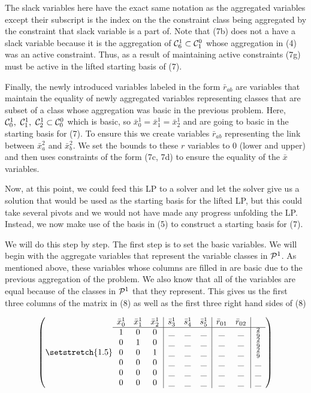 \documentclass[11pt]{article} %
\newcommand{\cP}{{\cal P}}
\newcommand{\cC}{{\cal C}}
\begin{document}
	The slack variables here have the exact same notation as the aggregated variables except their subscript is the index on the the constraint class being aggregated by the constraint that slack variable is a part of.  Note that (7b) does not a have a slack variable because it is the aggregation of $\cC^1_6 \subset \cC^0_1$ whose aggregation in (4) was an active constraint.  Thus, as a result of maintaining active constraints (7g) must be active in the lifted starting basis of (7).
	
	Finally, the newly introduced variables labeled in the form $\bar{r}_{ab}$ are variables that maintain the equality of newly aggregated variables representing classes that are subset of a class whose aggregation was basic in the previous problem.  Here, $\cC^1_0, \ \cC^1_1, \ \cC^1_2 \subset \cC^0_0$ which is basic, so $\bar{x}_0^1 = \bar{x}_1^1 = \bar{x}_2^1$ and are going to basic in the starting basis for (7).  To ensure this we create variables $\bar{r}_{ab}$ representing the link between $\bar{x}_a^2$ and $\bar{x}_b^2$.  We set the bounds to these $r$ variables to 0 (lower and upper) and then uses constraints of the form (7c, 7d) to ensure the equality of the $\bar{x}$ variables.
	
	Now, at this point, we could feed this LP to a solver and let the solver give us a solution that would be used as the starting basis for the lifted LP, but this could take several pivots and we would not have made any progress unfolding the LP.  Instead, we now make use of the basis in (5) to construct a starting basis for (7). 
	
	We will do this step by step.  The first step is to set the basic variables.  We will begin with the aggregate variables that represent the variable classes in $\cP^1$.  As mentioned above, these variables whose columns are filled in are basic due to the previous aggregation of the problem.  We also know that all of the variables are equal because of the classes in $\cP^1$ that they represent.  This gives us the first three columns of the matrix in (8) as well as the first three right hand sides of (8)
	
	\begin{equation}
	\begin{pmatrix}\setstretch{1.5}
	\begin{array}{ccc|ccc|cc|c}
	\bar{x}^1_0 & \bar{x}^1_1 & \bar{x}^1_2 & \bar{s}^1_3 & \bar{s}^1_4 & \bar{s}^1_5 & \bar{r}_{01} & \bar{r}_{02} \\
	\hline
	1 & 0 & 0 & \_ & \_ &\_ & \_ & \_ & \frac{2}{9} \\ 
	0 & 1 & 0 & \_ & \_ &\_ & \_ & \_ & \frac{2}{9} \\ 
	0 & 0 & 1 & \_ & \_ &\_ & \_ & \_ & \frac{2}{9} \\ 
	0 & 0 & 0 &\_ & \_ &\_ & \_ & \_& \_ \\ 
	0 & 0 & 0 & \_ & \_ &\_ & \_ & \_& \_ \\
	0 & 0 & 0 &\_ & \_ &\_ & \_& \_ & \_ \\
	\end{array}
	\end{pmatrix}
	\end{equation}
	 
\end{document}
